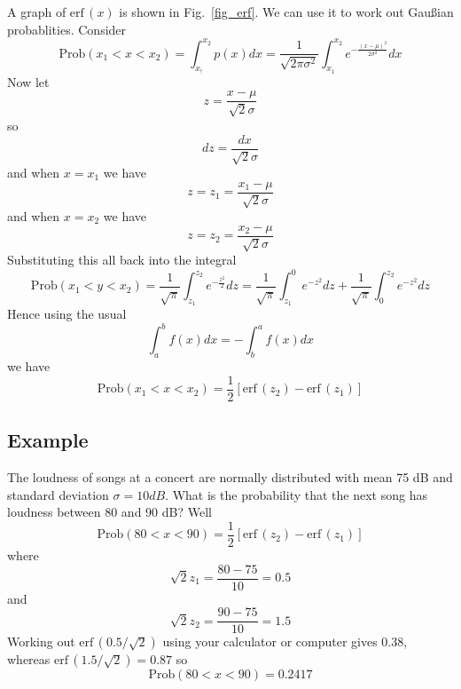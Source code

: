 \documentclass[11pt,a4paper]{scrartcl}
\begin{document}
A graph of $\mbox{erf}\,(x)$ is shown in Fig.~\ref{fig_erf}. We can use it to work out Gau\ss{}ian probablities. Consider
\begin{equation}
\mbox{Prob}(x_1<x<x_2)=\int_{x_!}^{x_2} p(x)dx=\frac{1}{\sqrt{2\pi\sigma^2}}\int_{x_1}^{x_2} e^{-\frac{(x-\mu)^2}{2\sigma^2}}dx 
\end{equation}
Now let
\begin{equation}
z=\frac{x-\mu}{\sqrt{2}\sigma}
\end{equation}
so 
\begin{equation}
dz=\frac{dx}{\sqrt{2}\sigma}
\end{equation}
and when $x=x_1$ we have
\begin{equation}
z=z_1=\frac{x_1-\mu}{\sqrt{2}\sigma}
\end{equation}
and when $x=x_2$ we have
\begin{equation}
z=z_2=\frac{x_2-\mu}{\sqrt{2}\sigma}
\end{equation}
Substituting this all back into the integral
\begin{equation}
\mbox{Prob}(x_1<y<x_2)=\frac{1}{\sqrt{\pi}}\int_{z_1}^{z_2} e^{-\frac{z^2}{2}}dz=\frac{1}{\sqrt{\pi}}\int_{z_1}^{0} e^{-z^2}dz+\frac{1}{\sqrt{\pi}}\int_{0}^{z_2} e^{-z^2}dz
\end{equation}
Hence using the usual 
\begin{equation}
\int_a^bf(x)dx=-\int_b^a f(x)dx
\end{equation}
we have
\begin{equation}
\mbox{Prob}(x_1<x<x_2)=\frac{1}{2}[\mbox{erf}\,(z_2)-\mbox{erf}\,(z_1)]
\end{equation}

\subsection*{Example}

The loudness of songs at a concert are normally distributed with mean 75 dB and standard deviation $\sigma=10 dB$. What is the probability that the next song has loudness between 80 and 90 dB? Well
\begin{equation}
\mbox{Prob}(80<x<90)=\frac{1}{2}[\mbox{erf}\,(z_2)-\mbox{erf}\,(z_1)]
\end{equation}
where 
\begin{equation}
\sqrt{2}z_1=\frac{80-75}{10}=0.5
\end{equation}
and 
\begin{equation}
\sqrt{2}z_2=\frac{90-75}{10}=1.5
\end{equation}
Working out $\mbox{erf}\,(0.5/\sqrt{2})$ using your calculator or computer gives 0.38, whereas $\mbox{erf}\,(1.5/\sqrt{2})=0.87$ so
\begin{equation}
\mbox{Prob}(80<x<90)=0.2417
\end{equation}

\newpage

\end{document}
